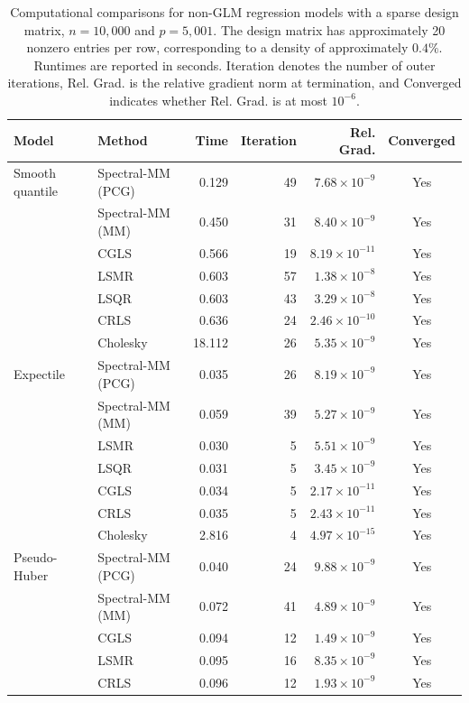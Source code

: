 \begin{table}[htbp]
\centering
\caption{
Computational comparisons for non-GLM regression models with a sparse design matrix,
$n=10{,}000$ and $p=5{,}001$.
The design matrix has approximately 20 nonzero entries per row,
corresponding to a density of approximately $0.4\%$.
Runtimes are reported in seconds.
Iteration denotes the number of outer iterations,
Rel. Grad. is the relative gradient norm at termination,
and Converged indicates whether Rel. Grad. is at most $10^{-6}$.
}
\label{tab:nonglm-comparison-sparse}
\begin{tabular}{llrrrc}
\toprule
Model & Method & Time & Iteration & Rel. Grad. & Converged \\
\midrule
Smooth quantile & Spectral-MM (PCG) & 0.129 & 49 & $7.68\times10^{-9}$ & Yes \\
 & Spectral-MM (MM) & 0.450 & 31 & $8.40\times10^{-9}$ & Yes \\
 & CGLS & 0.566 & 19 & $8.19\times10^{-11}$ & Yes \\
 & LSMR & 0.603 & 57 & $1.38\times10^{-8}$ & Yes \\
 & LSQR & 0.603 & 43 & $3.29\times10^{-8}$ & Yes \\
 & CRLS & 0.636 & 24 & $2.46\times10^{-10}$ & Yes \\
 & Cholesky & 18.112 & 26 & $5.35\times10^{-9}$ & Yes \\
\midrule
Expectile & Spectral-MM (PCG) & 0.035 & 26 & $8.19\times10^{-9}$ & Yes \\
 & Spectral-MM (MM) & 0.059 & 39 & $5.27\times10^{-9}$ & Yes \\
 & LSMR & 0.030 & 5 & $5.51\times10^{-9}$ & Yes \\
 & LSQR & 0.031 & 5 & $3.45\times10^{-9}$ & Yes \\
 & CGLS & 0.034 & 5 & $2.17\times10^{-11}$ & Yes \\
 & CRLS & 0.035 & 5 & $2.43\times10^{-11}$ & Yes \\
 & Cholesky & 2.816 & 4 & $4.97\times10^{-15}$ & Yes \\
\midrule
Pseudo-Huber & Spectral-MM (PCG) & 0.040 & 24 & $9.88\times10^{-9}$ & Yes \\
 & Spectral-MM (MM) & 0.072 & 41 & $4.89\times10^{-9}$ & Yes \\
 & CGLS & 0.094 & 12 & $1.49\times10^{-9}$ & Yes \\
 & LSMR & 0.095 & 16 & $8.35\times10^{-9}$ & Yes \\
 & CRLS & 0.096 & 12 & $1.93\times10^{-9}$ & Yes \\

\end{tabular}
\end{table}
